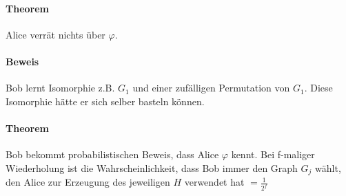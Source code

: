 \paragraph*{Theorem} Alice verrät nichts über $\varphi$.

\paragraph*{Beweis} Bob lernt Isomorphie z.B. $G_1$ und einer zufälligen Permutation von $G_1$. Diese Isomorphie hätte er sich selber basteln können.

\paragraph*{Theorem} Bob bekommt probabilistischen Beweis, dass Alice $\varphi$ kennt. Bei f-maliger Wiederholung ist die Wahrscheinlichkeit, dass Bob immer den Graph $G_j$ wählt, den Alice zur Erzeugung des jeweiligen $H$ verwendet hat $= \frac{1}{2^f}$